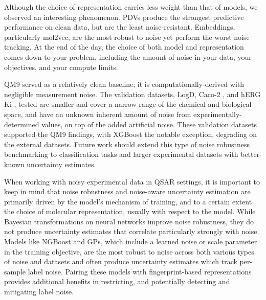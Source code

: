 Although the choice of representation carries less weight than that of models, we observed an interesting phenomenon. PDVs produce the strongest predictive performance on clean data, but are the least noise-resistant. Embeddings, particularly mol2vec, are the most robust to noise yet perform the worst noise tracking. At the end of the day, the choice of both model and representation comes down to your problem, including the amount of noise in your data, your objectives, and your compute limits. 

QM9 served as a relatively clean baseline; it is computationally-derived with negligible measurement noise. The validation datasets, LogD, Caco-2 \citep{openadmet}, and hERG Ki \citep{Zdrazil2023}, tested are smaller and cover a narrow range of the chemical and biological space, and have an unknown inherent amount of noise from experimentally-determined values, on top of the added artificial noise. These validation datasets supported the QM9 findings, with XGBoost the notable exception, degrading on the external datasets. Future work should extend this type of noise robustness benchmarking to classification tasks and larger experimental datasets with better-known uncertainty estimates.

When working with noisy experimental data in QSAR settings, it is important to keep in mind that noise robustness and noise-aware uncertainty estimation are primarily driven by the model's mechanism of training, and to a certain extent the choice of molecular representation, usually with respect to the model. While Bayesian transformations on neural networks improve noise robustness, they do not produce uncertainty estimates that correlate particularly strongly with noise. Models like NGBoost and GPs, which include a learned noise or scale parameter in the training objective, are the most robust to noise across both various types of noise and datasets and often produce uncertainty estimates which track per-sample label noise. Pairing these models with fingerprint-based representations provides additional benefits in restricting, and potentially detecting and mitigating label noise. 


